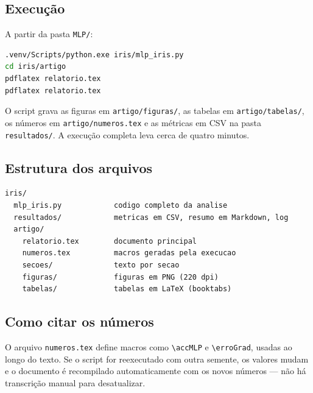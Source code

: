\subsection{Execução}

A partir da pasta \texttt{MLP/}:

\begin{lstlisting}[language=bash,caption={Comandos para reproduzir a análise e compilar o relatório.},label={lst:repro}]
.venv/Scripts/python.exe iris/mlp_iris.py
cd iris/artigo
pdflatex relatorio.tex
pdflatex relatorio.tex
\end{lstlisting}

O script grava as figuras em \texttt{artigo/figuras/}, as tabelas em \texttt{artigo/tabelas/}, os
números em \texttt{artigo/numeros.tex} e as métricas em CSV na pasta \texttt{resultados/}. A
execução completa leva cerca de quatro minutos.

\subsection{Estrutura dos arquivos}

\begin{lstlisting}[caption={Organização da pasta \texttt{iris/}.},label={lst:estrutura}]
iris/
  mlp_iris.py            codigo completo da analise
  resultados/            metricas em CSV, resumo em Markdown, log
  artigo/
    relatorio.tex        documento principal
    numeros.tex          macros geradas pela execucao
    secoes/              texto por secao
    figuras/             figuras em PNG (220 dpi)
    tabelas/             tabelas em LaTeX (booktabs)
\end{lstlisting}

\subsection{Como citar os números}

O arquivo \texttt{numeros.tex} define macros como \verb|\accMLP| e \verb|\erroGrad|, usadas ao
longo do texto. Se o script for reexecutado com outra semente, os valores mudam e o documento é
recompilado automaticamente com os novos números --- não há transcrição manual para desatualizar.

